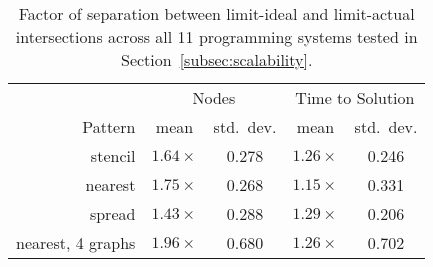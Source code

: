 \begin{table}[t]
\centering
\small
\begin{tabular}{r | c | c | c | c}
        & \multicolumn{2}{|c|}{Nodes} & \multicolumn{2}{|c}{Time to Solution} \\
Pattern & mean & std.~dev. & mean & std.~dev. \\
\hline
stencil & $1.64\times$ & 0.278 & $1.26\times$ & 0.246 \\
nearest & $1.75\times$ & 0.268 & $1.15\times$ & 0.331 \\
spread  & $1.43\times$ & 0.288 & $1.29\times$ & 0.206 \\
nearest, 4 graphs & $1.96\times$ & 0.680 & $1.26\times$ & 0.702
\end{tabular}

\vspace{-0.20cm}
\caption{Factor of separation between limit-ideal and limit-actual intersections across all 11 programming systems tested in Section~\ref{subsec:scalability}.\label{tab:metg-predict-strong}}
\vspace{-0.5cm}
\end{table}
